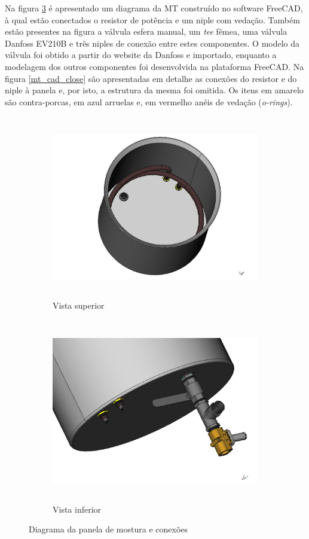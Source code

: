 Na figura \ref{mt_cad} é apresentado um diagrama da MT construído no software FreeCAD, à qual estão conectados o resistor de potência e um niple com vedação. Também estão presentes na figura a válvula esfera manual, um \textit{tee} fêmea, uma válvula Danfoss EV210B e três niples de conexão entre estes componentes. O modelo da válvula foi obtido a partir do website da Danfoss e importado, enquanto a modelagem dos outros componentes foi desenvolvida na plataforma FreeCAD. Na figura \ref{mt_cad_close} são apresentadas em detalhe as conexões do resistor e do niple à panela e, por isto, a estrutura da mesma foi omitida. Os itens em amarelo são contra-porcas, em azul arruelas e, em vermelho anéis de vedação (\textit{o-rings}).

\begin{figure}[H]
	\centering
	\begin{subfigure}{.46\textwidth}
		\centering
		\includegraphics[height=8cm]{./Resources/mecsys/mash-tun-top-color.pdf}
		\caption{Vista superior}
		\label{mt_cad:1}
	\end{subfigure}
	\begin{subfigure}{.46\textwidth}
		\centering
		\includegraphics[height=8cm]{./Resources/mecsys/mash-tun-bottom-color.pdf}
		\caption{Vista inferior}
		\label{mt_cad:2}
	\end{subfigure}
	\captionsetup{justification=centering}
	\caption[Diagrama da panela de mostura e conexões]{Diagrama da panela de mostura e conexões}
	\label{mt_cad}
\end{figure}

